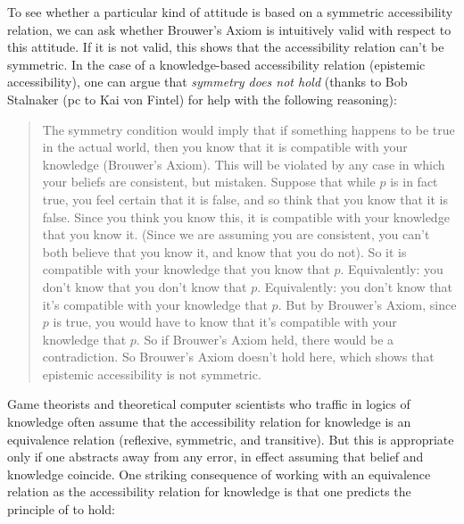To see whether a particular kind of attitude is based on a symmetric
accessibility relation, we can ask whether Brouwer's Axiom is intuitively valid
with respect to this attitude. If it is not valid, this shows that the
accessibility relation can't be symmetric. In the case of a knowledge-based
accessibility relation (epistemic accessibility), one can argue that
\emph{symmetry does not hold} (thanks to Bob Stalnaker (pc to Kai von
  Fintel) for help with the following reasoning):
\begin{quote}
  
  The symmetry condition would imply that if something happens to be true in the
  actual world, then you know that it is compatible with your knowledge
  (Brouwer's Axiom). This will be violated by any case in which your beliefs are
  consistent, but mistaken. Suppose that while $p$ is in fact true, you feel
  certain that it is false, and so think that you know that it is false. Since
  you think you know this, it is compatible with your knowledge that you know
  it. (Since we are assuming you are consistent, you can't both believe that you
  know it, and know that you do not). So it is compatible with your knowledge
  that you know that  $p$. Equivalently: you don't know that you don't know that  $p$.
  Equivalently: you don't know that it's compatible with your knowledge that
  $p$. But by Brouwer's Axiom, since $p$ is true, you would have to know that
  it's compatible with your knowledge that $p$. So if Brouwer's Axiom held,
  there would be a contradiction. So Brouwer's Axiom doesn't hold here, which
  shows that epistemic accessibility is not symmetric.
\end{quote}

%
Game theorists and theoretical computer scientists who traffic in logics of
knowledge often assume that the accessibility relation for knowledge is an
equivalence relation (reflexive, symmetric, and transitive). But this is
appropriate only if one abstracts away from any error, in effect assuming that
belief and knowledge coincide. One striking consequence of working with an
equivalence relation as the accessibility relation for knowledge is that one
predicts the principle of  to hold:

